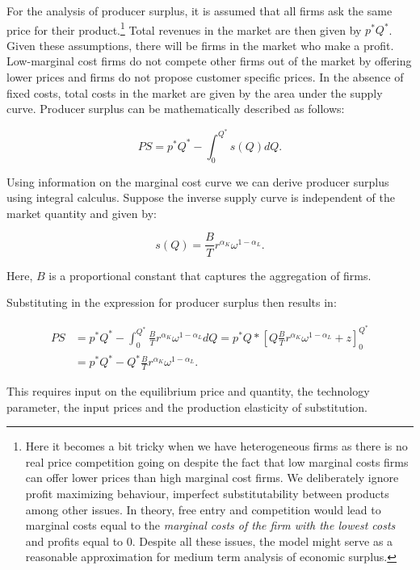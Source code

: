 \documentclass[
]{book}
\begin{document}
For the analysis of producer surplus, it is assumed that all firms ask the same price for their product.\footnote{Here it becomes a bit tricky when we have heterogeneous firms as there is no real price competition going on despite the fact that low marginal costs firms can offer lower prices than high marginal cost firms. We deliberately ignore profit maximizing behaviour, imperfect substitutability between products among other issues. In theory, free entry and competition would lead to marginal costs equal to the \emph{marginal costs of the firm with the lowest costs} and profits equal to 0. Despite all these issues, the model might serve as a reasonable approximation for medium term analysis of economic surplus.} Total revenues in the market are then given by \(p^\ast Q^\ast\). Given these assumptions, there will be firms in the market who make a profit. Low-marginal cost firms do not compete other firms out of the market by offering lower prices and firms do not propose customer specific prices. In the absence of fixed costs, total costs in the market are given by the area under the supply curve. Producer surplus can be mathematically described as follows:

\begin{equation}
PS  = p^\ast Q^\ast - \int_0^{Q^\ast} s(Q)dQ.
\end{equation}

Using information on the marginal cost curve we can derive producer surplus using integral calculus. Suppose the inverse supply curve is independent of the market quantity and given by:

\begin{equation}
s(Q) = \frac{B}{T}r^{\alpha_K}\omega^{1-\alpha_L}.
\end{equation}

Here, \(B\) is a proportional constant that captures the aggregation of firms.

Substituting in the expression for producer surplus then results in:

\begin{align}
PS  &= p^\ast Q^\ast - \int_0^{Q^\ast} \frac{B}{T}r^{\alpha_K}\omega^{1-\alpha_L} dQ =  p^\ast Q\ast \left[Q \frac{B}{T}r^{\alpha_K}\omega^{1-\alpha_L} + z\right]^{Q^\ast}_0 \\
&= p^\ast Q^\ast - Q^\ast \frac{B}{T}r^{\alpha_K}\omega^{1-\alpha_L}.
\end{align}

This requires input on the equilibrium price and quantity, the technology parameter, the input prices and the production elasticity of substitution.
\end{document}
